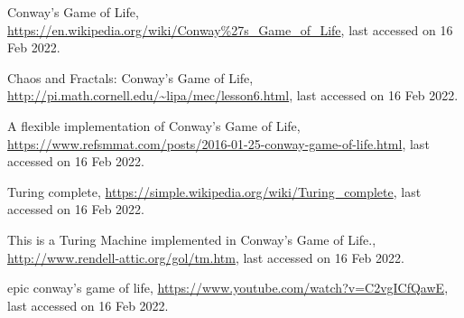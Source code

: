 \documentclass[addpoints]{exam}
\begin{document}
\newpage
\begin{thebibliography}{9}

  Conway’s Game of Life, \url{https://en.wikipedia.org/wiki/Conway%27s_Game_of_Life}, last accessed on 16 Feb 2022.

  Chaos and Fractals: Conway’s Game of Life, \url{http://pi.math.cornell.edu/~lipa/mec/lesson6.html}, last accessed on 16 Feb 2022.

  A flexible implementation of Conway's Game of Life, \url{https://www.refsmmat.com/posts/2016-01-25-conway-game-of-life.html}, last accessed on 16 Feb 2022.

  Turing complete, \url{https://simple.wikipedia.org/wiki/Turing_complete}, last accessed on 16 Feb 2022.

  This is a Turing Machine implemented in Conway's Game of Life., \url{http://www.rendell-attic.org/gol/tm.htm}, last accessed on 16 Feb 2022.

  epic conway's game of life, \url{https://www.youtube.com/watch?v=C2vgICfQawE}, last accessed on 16 Feb 2022.
\end{thebibliography}
\end{document}
